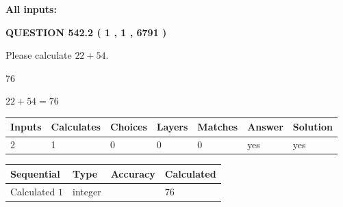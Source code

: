 \documentclass[12pt]{article}
\begin{document}
   
   
   
\noindent{}
   
   
   
   
\noindent\vspace{0.1in}\hspace{-0.08in} {\textbf{\Large{All inputs: }}}
   
   
  
\vspace{0.2in}
  
{\textbf{\Large{QUESTION
542.2 
 ( 1 , 1 , 6791 )
}}}
  
  
 
Please calculate $ %
22 +  %
54 $.
 
 
 
\noindent{}
 
 

76
 
 
\noindent{}
 
 

 
 
 
\noindent{}
 
 

$ %
22 +  %
54=   %
76$
 
 
\noindent{}
 
 

 
   
   
   
   
\noindent\begin{tabular}{|l|l|l|l|l|l|l|}
 \hline
Inputs & Calculates & Choices & Layers & Matches & Answer & Solution \\ \hline
 2  & 
 1  & 
 0
  & 
 0  & 
 0  & 
  yes & 
  yes 
  \\ \hline
 \end{tabular}
   
   
   
   
\noindent{}
   
   
  
  
\noindent\begin{tabular}{|l|l|l|l|}
\hline
 Sequential & Type & Accuracy & Calculated \\ 
\hline
 
 
  Calculated $  1 $ & integer &  & 
  $ 76 $ 
 \\  \hline  
 \end{tabular}
   
\end{document}
